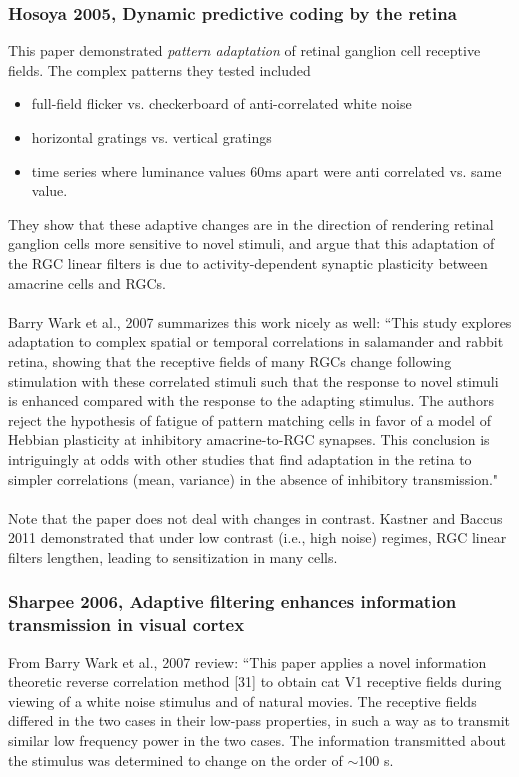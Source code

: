 \documentclass{article}
\begin{document}
\subsubsection{Hosoya 2005, Dynamic predictive coding by the retina}
This paper demonstrated {\it pattern adaptation} of retinal ganglion cell receptive fields.  The complex patterns they tested included
\begin{itemize}
\item full-field flicker vs. checkerboard of anti-correlated white noise
\item horizontal gratings vs. vertical gratings
\item time series where luminance values 60ms apart were anti correlated vs. same value.
\end{itemize}
They show that these adaptive changes are in the direction of rendering retinal ganglion cells more sensitive to novel stimuli, and argue that this adaptation of the RGC linear filters is due to activity-dependent synaptic plasticity between amacrine cells and RGCs.\\
\\
Barry Wark et al., 2007 summarizes this work nicely as well:
``This study explores adaptation to complex spatial or temporal correlations in salamander and rabbit retina, showing that the receptive fields of many RGCs change following stimulation with these correlated stimuli such that the response to novel stimuli is enhanced compared with the response to the adapting stimulus. The authors reject the hypothesis of fatigue of pattern matching cells in favor of a model of Hebbian plasticity at inhibitory amacrine-to-RGC synapses. This conclusion is intriguingly at odds with other studies that find adaptation in the retina to simpler correlations (mean, variance) in the absence of inhibitory transmission." \\
\\
Note that the paper does not deal with changes in contrast.  Kastner and Baccus 2011 demonstrated that under low contrast (i.e., high noise) regimes, RGC linear filters lengthen, leading to sensitization in many cells.

\subsubsection{Sharpee 2006, Adaptive filtering enhances information transmission in visual cortex}
From Barry Wark et al., 2007 review: ``This paper applies a novel information theoretic reverse correlation method [31] to obtain cat V1 receptive fields during viewing of a white noise stimulus and of natural movies. The receptive fields differed in the two cases in their low-pass properties, in such a way as to transmit similar low frequency power in the two cases. The information transmitted about the stimulus was determined to change on the order of $\sim$100 s.
\end{document}
